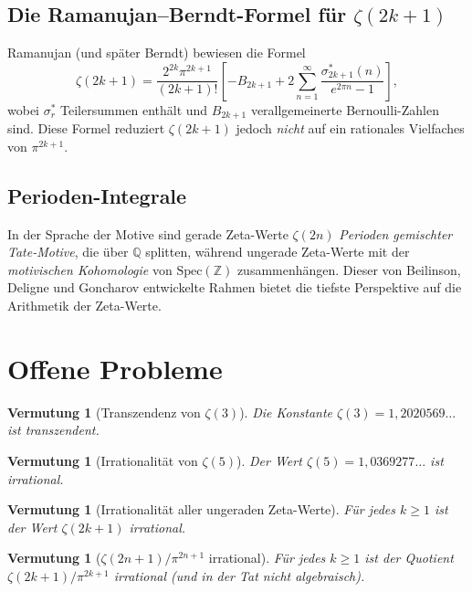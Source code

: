 \documentclass[12pt,a4paper]{amsart}
\newtheorem{vermutung}[theorem]{Vermutung}
\theoremstyle{definition}
\theoremstyle{remark}
\begin{document}
\subsection{Die Ramanujan--Berndt-Formel für $\zeta(2k+1)$}

Ramanujan (und später Berndt) bewiesen die Formel
\[
  \zeta(2k+1) = \frac{2^{2k} \pi^{2k+1}}{(2k+1)!}
  \left[
    - B_{2k+1} + 2 \sum_{n=1}^{\infty} \frac{\sigma_{2k+1}^*(n)}{e^{2\pi n} - 1}
  \right],
\]
wobei $\sigma_r^*$ Teilersummen enthält und $B_{2k+1}$ verallgemeinerte
Bernoulli-Zahlen sind. Diese Formel reduziert $\zeta(2k+1)$ jedoch
\emph{nicht} auf ein rationales Vielfaches von $\pi^{2k+1}$.

\subsection{Perioden-Integrale}

In der Sprache der Motive sind gerade Zeta-Werte $\zeta(2n)$ \emph{Perioden
gemischter Tate-Motive}, die über $\mathbb{Q}$ splitten, während ungerade
Zeta-Werte mit der \emph{motivischen Kohomologie} von $\mathrm{Spec}(\mathbb{Z})$
zusammenhängen. Dieser von Beilinson, Deligne und Goncharov entwickelte Rahmen
bietet die tiefste Perspektive auf die Arithmetik der Zeta-Werte.

\section{Offene Probleme}

\begin{vermutung}[Transzendenz von $\zeta(3)$]
  Die Konstante $\zeta(3) = 1{,}2020569\ldots$ ist transzendent.
\end{vermutung}

\begin{vermutung}[Irrationalität von $\zeta(5)$]
  Der Wert $\zeta(5) = 1{,}0369277\ldots$ ist irrational.
\end{vermutung}

\begin{vermutung}[Irrationalität aller ungeraden Zeta-Werte]
  Für jedes $k \geq 1$ ist der Wert $\zeta(2k+1)$ irrational.
\end{vermutung}

\begin{vermutung}[$\zeta(2n+1)/\pi^{2n+1}$ irrational]
  Für jedes $k \geq 1$ ist der Quotient $\zeta(2k+1)/\pi^{2k+1}$ irrational
  (und in der Tat nicht algebraisch).
\end{vermutung}
\end{document}
